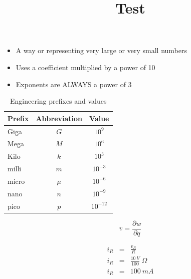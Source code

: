 \documentclass[10pt,landscape,twocolumn]{article}
\title{Test}
\begin{document}

\begin{itemize}
\item A way or representing very large or very small numbers
\item Uses a coefficient multiplied by a power of 10
\item Exponents are ALWAYS  a power of 3
\end{itemize}


\begin{table}[h]
	\centering
	\begin{tabular}{|l|c|c|}
		\hline
		Prefix & Abbreviation & Value \\
		\hline \hline
		Giga & $G$ & $10^9$ \\
		Mega & $M$ & $10^6$ \\
		Kilo & $k$ & $10^3$ \\
		\hline
		milli & $m$ & $10^{-3}$ \\
		micro & $\mu$ & $10^{-6}$ \\
		nano & $n$ & $10^{-9}$ \\
		pico & $p$ & $10^{-12}$ \\
		\hline
	\end{tabular}
	\caption{Engineering prefixes and values}
	\label{tab: Eng Prefixes}
\end{table}


\begin{equation}
	v = \frac{\partial w}{\partial q}
\end{equation}


\begin{eqnarray}
	i_R &=&\frac{v_R}{R} \nonumber\\
	i_R &=&\frac{10\ V}{100}\ \Omega \\
	i_R &=& 100\ mA \nonumber
\end{eqnarray}
\end{document}
